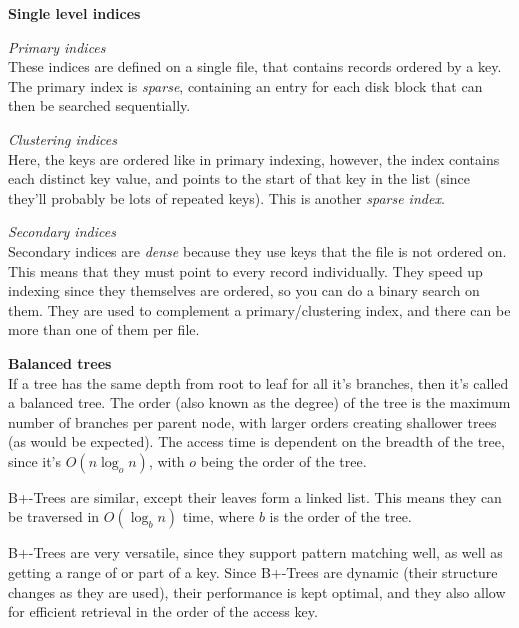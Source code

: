 \begin{description}
  \item \textbf{Single level indices}\\
    \begin{description}
      \item \textit{Primary indices}\\
        These indices are defined on a single file, that contains records
        ordered by a key. The primary index is \textit{sparse}, containing an
        entry for each disk block that can then be searched sequentially.
      
      \item \textit{Clustering indices}\\
        Here, the keys are ordered like in primary indexing, however, the index
        contains each distinct key value, and points to the start of that key in
        the list (since they'll probably be lots of repeated keys). This is
        another \textit{sparse index}.

      \item \textit{Secondary indices}\\
        Secondary indices are \textit{dense} because they use keys that the file
        is not ordered on. This means that they must point to every record
        individually. They speed up indexing since they themselves are ordered,
        so you can do a binary search on them. They are used to complement a
        primary/clustering index, and there can be more than one of them per
        file.
    \end{description}
  \item \textbf{Balanced trees}\\
    If a tree has the same depth from root to leaf for all it's branches, then
    it's called a balanced tree. The order (also known as the degree) of the
    tree is the maximum number of branches per parent node, with larger orders
    creating shallower trees (as would be expected). The access time is
    dependent on the breadth of the tree, since it's $O(n\log_o{n})$, with $o$
    being the order of the tree.

    B+-Trees are similar, except their leaves form a linked list. This means
    they can be traversed in $O(\log_b{n})$ time, where $b$ is the order of the
    tree.

    B+-Trees are very versatile, since they support pattern matching well, as
    well as getting a range of or part of a key. Since B+-Trees are dynamic
    (their structure changes as they are used), their performance is kept
    optimal, and they also allow for efficient retrieval in the order of the
    access key.
\end{description}

